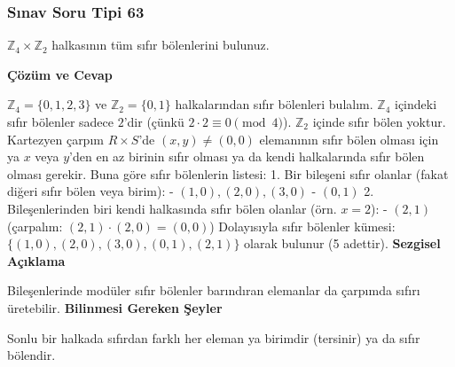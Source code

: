 \documentclass[11pt, a4paper]{article}
\newenvironment{cozum}{
    \vspace{0.5cm}
    \noindent\textcolor{green!60!black}{\faCheckCircle\enspace \textbf{\Large Çözüm ve Cevap}}\par\vspace{0.2cm}
}{}
\newenvironment{sezgisel}{
    \vspace{0.5cm}
    \noindent\textcolor{orange!80!black}{\faLightbulb\enspace \textbf{\Large Sezgisel Açıklama}}\par\vspace{0.2cm}
    \itshape
}{}
\newenvironment{bilgi}{
    \vspace{0.5cm}
    \noindent\textcolor{red!70!black}{\faExclamationTriangle\enspace \textbf{\Large Bilinmesi Gereken Şeyler}}\par\vspace{0.2cm}
}{}
\begin{document}
\subsubsection{Sınav Soru Tipi 63}
\begin{sinavbox}
$\mathbb{Z}_{4} \times \mathbb{Z}_{2}$ halkasının tüm sıfır bölenlerini bulunuz.
\end{sinavbox}
\begin{cozum}
$\mathbb{Z}_4 = \{0, 1, 2, 3\}$ ve $\mathbb{Z}_2 = \{0, 1\}$ halkalarından sıfır bölenleri bulalım.
$\mathbb{Z}_4$ içindeki sıfır bölenler sadece $2$'dir (çünkü $2 \cdot 2 \equiv 0 \pmod 4$).
$\mathbb{Z}_2$ içinde sıfır bölen yoktur.
Kartezyen çarpım $R \times S$'de $(x, y) \neq (0, 0)$ elemanının sıfır bölen olması için ya $x$ veya $y$'den en az birinin sıfır olması ya da kendi halkalarında sıfır bölen olması gerekir.
Buna göre sıfır bölenlerin listesi:
1. Bir bileşeni sıfır olanlar (fakat diğeri sıfır bölen veya birim):
   - $(1, 0), (2, 0), (3, 0)$
   - $(0, 1)$
2. Bileşenlerinden biri kendi halkasında sıfır bölen olanlar (örn. $x=2$):
   - $(2, 1)$ (çarpalım: $(2, 1) \cdot (2, 0) = (0, 0)$)
Dolayısıyla sıfır bölenler kümesi: $\{ (1, 0), (2, 0), (3, 0), (0, 1), (2, 1) \}$ olarak bulunur (5 adettir).
\end{cozum}
\begin{sezgisel}
Bileşenlerinde modüler sıfır bölenler barındıran elemanlar da çarpımda sıfırı üretebilir.
\end{sezgisel}
\begin{bilgi}
Sonlu bir halkada sıfırdan farklı her eleman ya birimdir (tersinir) ya da sıfır bölendir.
\end{bilgi}

\newpage
\end{document}
